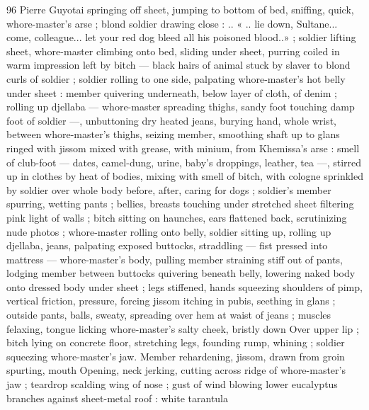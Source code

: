 96 Pierre Guyotai
springing off sheet, jumping to bottom of bed, sniffing, quick,
whore-master's arse ; blond soldier drawing close : .. « .. lie down,
Sultane... come, colleague... let your red dog bleed all his poisoned
blood..» ; soldier lifting sheet, whore-master climbing onto bed,
sliding under sheet, purring coiled in warm impression left by bitch
— black hairs of animal stuck by slaver to blond curls of soldier ;
soldier rolling to one side, palpating whore-master’s hot belly under
sheet : member quivering underneath, below layer of cloth, of denim
; rolling up djellaba — whore-master spreading thighs, sandy foot
touching damp foot of soldier —, unbuttoning dry heated jeans,
burying hand, whole wrist, between whore-master's thighs, seizing
member, smoothing shaft up to glans ringed with jissom mixed with
grease, with minium, from Khemissa’s arse : smell of club-foot —
dates, camel-dung, urine, baby's droppings, leather, tea —, stirred
up in clothes by heat of bodies, mixing with smell of bitch, with
cologne sprinkled by soldier over whole body before, after, caring for
dogs ; soldier's member spurring, wetting pants ; bellies, breasts
touching under stretched sheet filtering pink light of walls ; bitch
sitting on haunches, ears flattened back, scrutinizing nude photos ;
whore-master rolling onto belly, soldier sitting up, rolling up djellaba,
jeans, palpating exposed buttocks, straddling — fist pressed into
mattress — whore-master's body, pulling member straining stiff out
of pants, lodging member between buttocks quivering beneath belly,
lowering naked body onto dressed body under sheet ; legs stiffened,
hands squeezing shoulders of pimp, vertical friction, pressure,
forcing jissom itching in pubis, seething in glans ; outside pants,
balls, sweaty, spreading over hem at waist of jeans ; muscles
felaxing, tongue licking whore-master's salty cheek, bristly down
Over upper lip ; bitch lying on concrete floor, stretching legs,
founding rump, whining ; soldier squeezing whore-master's jaw.
Member rehardening, jissom, drawn from groin spurting, mouth
Opening, neck jerking, cutting across ridge of whore-master's jaw ;
teardrop scalding wing of nose ; gust of wind blowing lower
eucalyptus branches against sheet-metal roof : white tarantula

